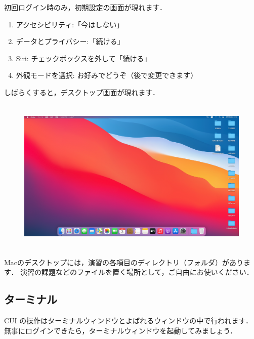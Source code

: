 \documentclass{jarticle}
\begin{document}
初回ログイン時のみ，初期設定の画面が現れます．
\begin{enumerate}
  \item アクセシビリティ:「今はしない」
  \item データとプライバシー:「続ける」
  \item Siri: チェックボックスを外して「続ける」
  \item 外観モードを選択: お好みでどうぞ（後で変更できます）
\end{enumerate}

しばらくすると，デスクトップ画面が現れます．
\begin{figure}[H]
  \centering
  \includegraphics[height=7.5cm]{fig/MacDesktop.png}
\end{figure}

Macのデスクトップには，演習の各項目のディレクトリ（フォルダ）があります．
演習の課題などのファイルを置く場所として，ご自由にお使いください．

\subsection{ターミナル}
 CUI の操作はターミナルウィンドウとよばれるウィンドウの中で行われます．
 無事にログインできたら，ターミナルウィンドウを起動してみましょう． 

\end{document}

